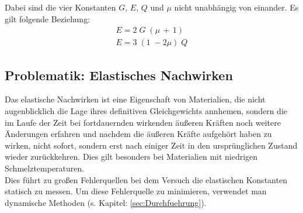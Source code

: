 Dabei sind die vier Konstanten $G$, $E$, $Q$ und $\mu$ nicht unabhängig von einander.
Es gilt folgende Beziehung:
\begin{gather}
    E = 2\;G\;(\mu\,+\,1) \\
    E = 3\;(1\;-2\mu)\;Q
    \label{eqn:Beziehung}
\end{gather}


\subsection{Problematik: Elastisches Nachwirken}
Das elastische Nachwirken ist eine Eigenschaft von Materialien, die nicht augenblicklich die Lage ihres definitiven 
Gleichgewichts annhemen, sondern die im Laufe der Zeit bei fortdauernden wirkenden äußeren Kräften noch weitere Änderungen
erfahren und nachdem die äußeren Kräfte aufgehört haben zu wirken, nicht sofort, sondern erst nach einiger Zeit in den 
ursprünglichen Zustand wieder zurückkehren.\cite{elastisches_Nachwirken}
Dies gilt besonders bei Materialien mit niedrigen Schmelztemperaturen.\\
Dies führt zu großen Fehlerquellen bei dem Versuch die elastischen Konstanten statisch 
zu messen.\newline
Um diese Fehlerquelle zu minimieren, verwendet man dynamische Methoden (s. Kapitel: \ref{sec:Durchfuehrung}).
\label{sec:nachwirken_vorb}


\label{sec:Theorie}
